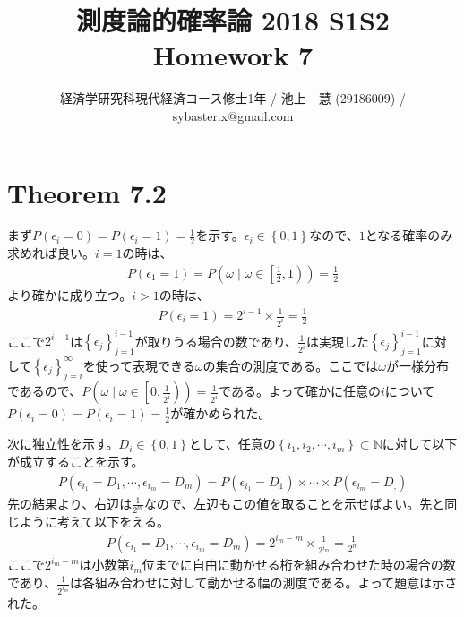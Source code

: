 \documentclass{article}
\begin{document}
\title{測度論的確率論 2018 S1S2 \\ 
Homework 7}
\author{経済学研究科現代経済コース修士1年 / 池上　慧 (29186009) / sybaster.x@gmail.com}
\maketitle

\section{Theorem 7.2}
まず$P(\epsilon_i = 0) = P(\epsilon_i = 1) = \frac{1}{2}$を示す。$\epsilon_i \in \left\{ 0,1\right\}$なので、$1$となる確率のみ求めれば良い。$i = 1$の時は、
\begin{align*}
	P(\epsilon_1 = 1) = P\left(\omega \mid \omega \in \left[\frac{1}{2}, 1\right)\right) = \frac{1}{2}
\end{align*}
より確かに成り立つ。$i > 1$の時は、
\begin{align*}
	P(\epsilon_i = 1) = 2^{i-1} \times \frac{1}{2^i} = \frac{1}{2}
\end{align*}
ここで$2^{i-1}$は$\left\{ \epsilon_j \right\}_{j = 1}^{i-1}$が取りうる場合の数であり、$\frac{1}{2^i}$は実現した$\left\{ \epsilon_j \right\}_{j=1}^{i-1}$に対して$\left\{ \epsilon_j \right\}_{j =i}^{\infty}$を使って表現できる$\omega$の集合の測度である。ここでは$\omega$が一様分布であるので、$P\left(\omega \mid \omega \in \left[0, \frac{1}{2^i}\right) \right) = \frac{1}{2^i}$である。よって確かに任意の$i$について$P(\epsilon_i = 0) = P(\epsilon_i = 1) = \frac{1}{2}$が確かめられた。

次に独立性を示す。$D_i \in \left\{ 0,1\right\}$として、任意の$\left\{ i_1, i_2, \cdots, i_m \right\} \subset \mathbb{N}$に対して以下が成立することを示す。
\begin{align*}
	P\left( \epsilon_{i_1} = D_1, \cdots, \epsilon_{i_m} = D_m \right) = P\left( \epsilon_{i_1} = D_1\right) \times \cdots \times P\left( \epsilon_{i_m} = D_,\right)
\end{align*}
先の結果より、右辺は$\frac{1}{2^m}$なので、左辺もこの値を取ることを示せばよい。先と同じように考えて以下をえる。
\begin{align*}
	P\left( \epsilon_{i_1} = D_1, \cdots, \epsilon_{i_m} = D_m \right) = 2^{i_m - m} \times \frac{1}{2^{i_m}} = \frac{1}{2^m}
\end{align*}
ここで$2^{i_m - m}$は小数第$i_m$位までに自由に動かせる桁を組み合わせた時の場合の数であり、$\frac{1}{2^{i_m}}$は各組み合わせに対して動かせる幅の測度である。よって題意は示された。
\end{document}
